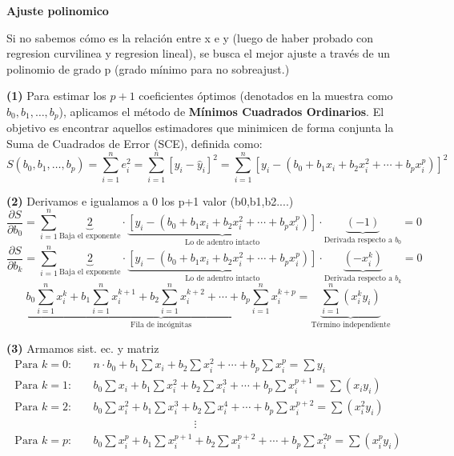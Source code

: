 \documentclass[10pt,a4paper]{article}
\begin{document}
\begin{center}
{\large\bfseries Ajuste polinomico}
\end{center}
\vspace{-2pt}

Si no sabemos cómo es la relación entre x e y (luego de haber probado con regresion curvilinea y regresion lineal), se busca el mejor ajuste a través de un polinomio de grado p (grado mínimo para no sobreajust.)

\textbf{(1)} Para estimar los $p+1$ coeficientes óptimos (denotados en la muestra como $b_0, b_1, \ldots, b_p$), aplicamos el método de \textbf{Mínimos Cuadrados Ordinarios}. El objetivo es encontrar aquellos estimadores que minimicen de forma conjunta la Suma de Cuadrados de Error (SCE), definida como:
\[
S(b_0,b_1,\ldots,b_p) = \sum_{i=1}^{n} e_i^2 = \sum_{i=1}^{n} [y_i-\hat{y}_i]^2 = \sum_{i=1}^{n} \left[ y_i - (b_0+b_1 x_i + b_2 x_i^2 + \cdots + b_p x_i^p) \right]^2
\]

\textbf{(2)} Derivamos e igualamos a 0 los p+1 valor (b0,b1,b2....)
\[
\frac{\partial S}{\partial b_0} = \sum_{i=1}^{n} \underbrace{2}_{\text{Baja el exponente}} \cdot \underbrace{\left[y_i - (b_0+b_1 x_i+b_2 x_i^2+\cdots+b_p x_i^p)\right]}_{\text{Lo de adentro intacto}} \cdot \underbrace{(-1)}_{\text{Derivada respecto a } b_0} = 0
\]
\[
\frac{\partial S}{\partial b_k} = \sum_{i=1}^{n} \underbrace{2}_{\text{Baja el exponente}} \cdot \underbrace{\left[y_i - (b_0+b_1 x_i+b_2 x_i^2+\cdots+b_p x_i^p)\right]}_{\text{Lo de adentro intacto}} \cdot \underbrace{(-x_i^k)}_{\text{Derivada respecto a } b_k} = 0
\]
\[
\underbrace{b_0\sum_{i=1}^{n} x_i^k + b_1\sum_{i=1}^{n} x_i^{k+1} + b_2\sum_{i=1}^{n} x_i^{k+2} + \cdots + b_p\sum_{i=1}^{n} x_i^{k+p}}_{\text{Fila de incógnitas}} = \underbrace{\sum_{i=1}^{n}(x_i^k y_i)}_{\text{Término independiente}}
\]

\textbf{(3)} Armamos sist. ec. y matriz
\begin{align*}
\text{Para } k=0: &\quad n\cdot b_0 + b_1\sum x_i + b_2\sum x_i^2 + \cdots + b_p\sum x_i^p = \sum y_i \\
\text{Para } k=1: &\quad b_0\sum x_i + b_1\sum x_i^2 + b_2\sum x_i^3 + \cdots + b_p\sum x_i^{p+1} = \sum (x_i y_i) \\
\text{Para } k=2: &\quad b_0\sum x_i^2 + b_1\sum x_i^3 + b_2\sum x_i^4 + \cdots + b_p\sum x_i^{p+2} = \sum (x_i^2 y_i) \\
&\qquad\qquad\qquad\qquad\qquad \vdots \\
\text{Para } k=p: &\quad b_0\sum x_i^p + b_1\sum x_i^{p+1} + b_2\sum x_i^{p+2} + \cdots + b_p\sum x_i^{2p} = \sum (x_i^p y_i)
\end{align*}
\end{document}

